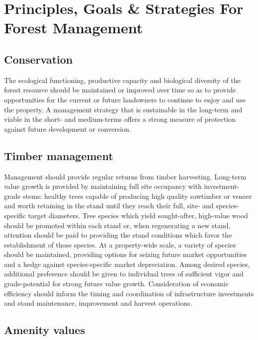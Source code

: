 \documentclass[]{tufte-handout}
\begin{document}
\section{Principles, Goals \& Strategies For Forest
Management}\label{principles-goals-strategies-for-forest-management}

\subsection{Conservation}\label{conservation}

The ecological functioning, productive capacity and biological diversity
of the forest resource should be maintained or improved over time so as
to provide opportunities for the current or future landowners to
continue to enjoy and use the property. A management strategy that is
sustainable in the long-term and viable in the short- and medium-terms
offers a strong measure of protection against future development or
conversion.

\subsection{Timber management}\label{timber-management}

Management should provide regular returns from timber harvesting.
Long-term value growth is provided by maintaining full site occupancy
with investment-grade stems: healthy trees capable of producing high
quality sawtimber or veneer and worth retaining in the stand until they
reach their full, site- and species-specific target diameters. Tree
species which yield sought-after, high-value wood should be promoted
within each stand or, when regenerating a new stand, attention should be
paid to providing the stand conditions which favor the establishment of
those species. At a property-wide scale, a variety of species should be
maintained, providing options for seizing future market opportunities
and a hedge against species-specific market depreciation. Among desired
species, additional preference should be given to individual trees of
sufficient vigor and grade-potential for strong future value growth.
Consideration of economic efficiency should inform the timing and
coordination of infrastructure investments and stand maintenance,
improvement and harvest operations.

\subsection{Amenity values}\label{amenity-values}
\end{document}
